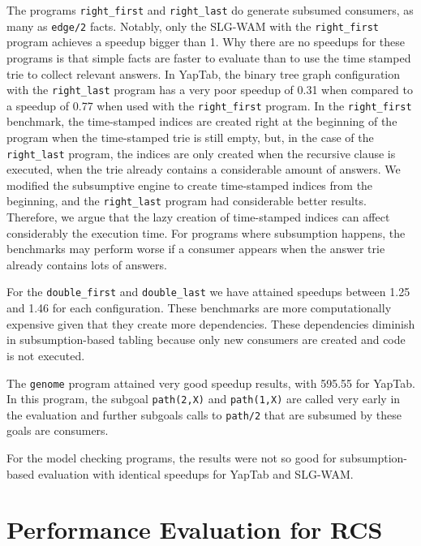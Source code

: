 The programs \texttt{right\_first} and \texttt{right\_last} do generate subsumed consumers,
as many as \texttt{edge/2} facts. Notably, only the SLG-WAM with the \texttt{right\_first} program
achieves a speedup bigger than 1. Why there are no speedups for these programs is that simple facts
are faster to evaluate than to use the time stamped trie to collect relevant answers.
In YapTab, the binary tree graph configuration with the \texttt{right\_last} program has a very poor speedup
of 0.31 when compared to a speedup of 0.77 when used with the \texttt{right\_first} program.
In the \texttt{right\_first} benchmark, the time-stamped indices are created right at
the beginning of the program when the time-stamped trie is still empty, but, in the case of the \texttt{right\_last}
program, the indices are only created when the recursive clause is executed, when the trie already contains
a considerable amount of answers. We modified the subsumptive engine to create time-stamped indices from the
beginning, and the \texttt{right\_last} program had considerable better results. Therefore, we argue that the
lazy creation of time-stamped indices can affect considerably the execution time. For programs where subsumption
happens, the benchmarks may perform worse if a consumer appears when the answer trie already contains lots of answers.

For the \texttt{double\_first} and \texttt{double\_last} we have attained speedups between 1.25 and 1.46
for each configuration. These benchmarks are more computationally expensive given that they create more
dependencies. These dependencies diminish in subsumption-based tabling because only new consumers are created
and code is not executed.

The \texttt{genome} program attained very good speedup results, with
595.55 for YapTab. In this program, the subgoal \texttt{path(2,X)} and \texttt{path(1,X)} are called
very early in the evaluation and further subgoals calls to \texttt{path/2} that are subsumed by these
goals are consumers.

For the model checking programs, the results were not so good for subsumption-based evaluation with
identical speedups for YapTab and SLG-WAM.




\section{Performance Evaluation for RCS}

